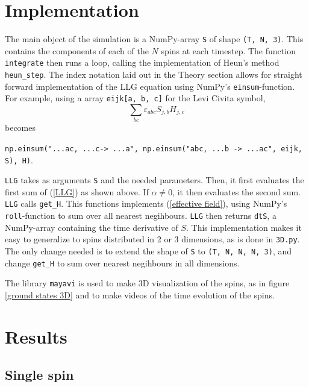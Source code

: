 \documentclass{article}
\begin{document}
    \section*{Implementation}
    The main object of the simulation is a NumPy-array \verb|S| of shape \verb|(T, N, 3)|. This contains the components of each of the $N$ spins at each timestep. The function \verb|integrate| then runs a loop, calling the implementation of Heun's method \verb|heun_step|. The index notation laid out in the Theory section allows for straight forward implementation of the LLG equation using NumPy's \verb|einsum|-function. For example, using a array \verb|eijk[a, b, c]| for the Levi Civita symbol, 
    $$
    \sum_{b c}\varepsilon_{abc}S_{j, b}H_{j,c}
    $$
    becomes
    \begin{center}
        \verb|np.einsum("...ac, ...c-> ...a", np.einsum("abc, ...b -> ...ac", eijk, S), H)|.        
    \end{center}

    \verb|LLG| takes as arguments \verb|S| and the needed parameters. Then, it first evaluates the first sum of (\ref{LLG}) as shown above. If $\alpha \neq 0$, it then evaluates the second sum. \verb|LLG| calls \verb|get_H|. This functions implements (\ref{effective field}), using NumPy's \verb|roll|-function to sum over all nearest negihbours. \verb|LLG| then returns \verb|dtS|, a NumPy-array containing the time derivative of $S$. This implementation makes it easy to generalize to spins distributed in 2 or 3 dimensions, as is done in \verb|3D.py|. The only change needed is to extend the shape of \verb|S| to \verb|(T, N, N, N, 3)|, and change \verb|get_H| to sum over nearest negihbours in all dimensions.

    The library \verb|mayavi| is used to make 3D visualization of the spins, as in figure \ref{ground states 3D} and to make videos of the time evolution of the spins. 


    \section*{Results}
    \subsection*{Single spin}
\end{document}
